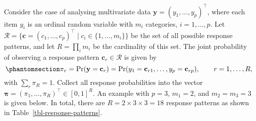 \documentclass[
  letterpaper,
  DIV=11,
  numbers=noendperiod]{scrartcl}
\begin{document}
Consider the case of analysing multivariate data
\(\mathbf y = (y_{1}, \ldots, y_{p})^\top\), where each item \(y_{i}\)
is an ordinal random variable with \(m_i\) categories, \(i=1,\dots,p\).
Let
\(\mathcal R = \{ \mathbf c = (c_1,\dots, c_p)^\top \mid c_i \in \{1,\dots, m_i\}\}\)
be the set of all possible response patterns, and let
\(R=\prod_{i} m_i\) be the cardinality of this set. The joint
probability of observing a response pattern
\(\mathbf c_r \in \mathcal R\) is given by
\begin{equation}\phantomsection\label{eq-each-joint-resp-prob}{
\pi_r = \Pr(\mathbf y = \mathbf c_r) = \Pr(y_1 = \mathbf c_{r1}, \ldots, y_p = \mathbf c_{rp}), \hspace{2em} r = 1, \ldots, R,
}\end{equation} with \(\sum_r \pi_R = 1\). Collect all response
probabilities into the vector
\(\boldsymbol \pi = (\pi_1, \ldots, \pi_R)^\top \in [0,1]^R\). An
example with \(p=3\), \(m_1=2\), and \(m_2=m_3=3\) is given below. In
total, there are \(R=2 \times 3 \times 3 = 18\) response patterns as
shown in Table~\ref{tbl-response-patterns}.
\end{document}
